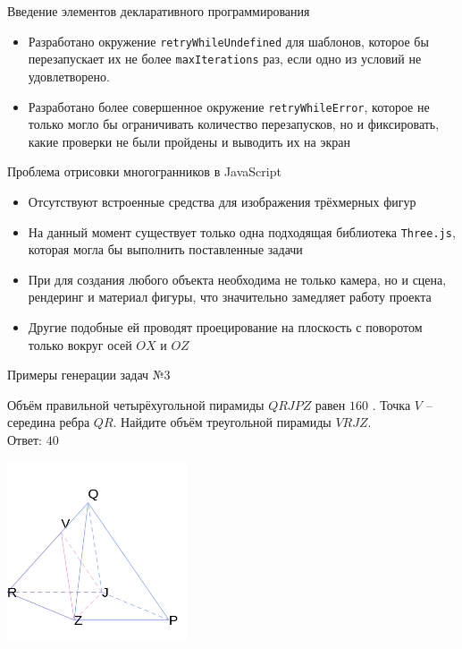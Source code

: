 \documentclass[aspectratio=169,12pt]{beamer}
\begin{document}
\begin{frame}{Введение элементов декларативного программирования}

	\begin{itemize}
		\item Разработано окружение \texttt{retryWhileUndefined} для шаблонов, которое бы перезапускает их не более \texttt{maxIterations} раз, если одно из условий не удовлетворено.
		\item Разработано более совершенное окружение \texttt{retryWhileError}, которое не только могло бы ограничивать количество перезапусков, но и фиксировать, какие проверки не были пройдены и выводить их на экран
	\end{itemize}

\end{frame}

\begin{frame}{Проблема отрисовки многогранников в JavaScript}
	\begin{itemize}
		\item Отсутствуют встроенные средства для изображения трёхмерных фигур
		\item На данный момент существует только одна подходящая библиотека \texttt{Three.js}, которая могла бы выполнить поставленные задачи
		\item При для создания любого объекта необходима не только камера, но и сцена, рендеринг и материал фигуры, что значительно замедляет работу проекта
		\item Другие подобные ей проводят проецирование на плоскость с поворотом только вокруг осей $OX$ и $OZ$
	\end{itemize}
\end{frame}

\begin{frame}{Примеры генерации задач №3}
	\begin{multicols}{2}
		Объём правильной четырёхугольной пирамиды $QRJPZ$ равен $160$ . Точка $V$  – середина ребра  $QR$. Найдите объём треугольной пирамиды  $VRJZ$.\\

		Ответ: $40$

		\includegraphics[width=0.4\textwidth]{1.png}
	\end{multicols}

\end{frame}
\end{document}
